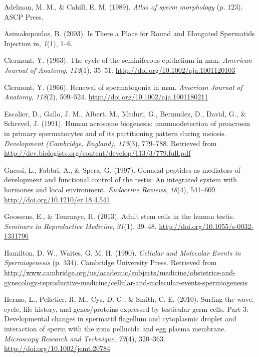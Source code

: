 \documentclass[12pt,twoside]{reedthesis}
\theoremstyle{definition}
\theoremstyle{definition}
\theoremstyle{remark}
\begin{document}
  \noindent
  
  \setlength{\parindent}{-0.20in} \setlength{\leftskip}{0.20in}
  \setlength{\parskip}{8pt}
  
  \hypertarget{refs}{}
  \hypertarget{ref-Adelman1989}{}
  Adelman, M. M., \& Cahill, E. M. (1989). \emph{Atlas of sperm
  morphology} (p. 123). ASCP Press.
  
  \hypertarget{ref-Asimakopoulos2003}{}
  Asimakopoulos, B. (2003). Is There a Place for Round and Elongated
  Spermatids Injection in, \emph{1}(1), 1--6.
  
  \hypertarget{ref-Clermont1963}{}
  Clermont, Y. (1963). The cycle of the seminiferous epithelium in man.
  \emph{American Journal of Anatomy}, \emph{112}(1), 35--51.
  \url{http://doi.org/10.1002/aja.1001120103}
  
  \hypertarget{ref-Clermont1966}{}
  Clermont, Y. (1966). Renewal of spermatogonia in man. \emph{American
  Journal of Anatomy}, \emph{118}(2), 509--524.
  \url{http://doi.org/10.1002/aja.1001180211}
  
  \hypertarget{ref-Escalier1991}{}
  Escalier, D., Gallo, J. M., Albert, M., Meduri, G., Bermudez, D., David,
  G., \& Schrevel, J. (1991). Human acrosome biogenesis: immunodetection
  of proacrosin in primary spermatocytes and of its partitioning pattern
  during meiosis. \emph{Development (Cambridge, England)}, \emph{113}(3),
  779--788. Retrieved from
  \url{http://dev.biologists.org/content/develop/113/3/779.full.pdf}
  
  \hypertarget{ref-Gnessi1997}{}
  Gnessi, L., Fabbri, A., \& Spera, G. (1997). Gonadal peptides as
  mediators of development and functional control of the testis: An
  integrated system with hormones and local environment. \emph{Endocrine
  Reviews}, \emph{18}(4), 541--609.
  \url{http://doi.org/10.1210/er.18.4.541}
  
  \hypertarget{ref-Goossens2013}{}
  Goossens, E., \& Tournaye, H. (2013). Adult stem cells in the human
  testis. \emph{Seminars in Reproductive Medicine}, \emph{31}(1), 39--48.
  \url{http://doi.org/10.1055/s-0032-1331796}
  
  \hypertarget{ref-Hamilton1987}{}
  Hamilton, D. W., Waites, G. M. H. (1990). \emph{Cellular and Molecular
  Events in Spermiogenesis} (p. 334). Cambridge University Press.
  Retrieved from
  \url{http://www.cambridge.org/us/academic/subjects/medicine/obstetrics-and-gynecology-reproductive-medicine/cellular-and-molecular-events-spermiogenesis}
  
  \hypertarget{ref-Hermo2010}{}
  Hermo, L., Pelletier, R. M., Cyr, D. G., \& Smith, C. E. (2010). Surfing
  the wave, cycle, life history, and genes/proteins expressed by
  testicular germ cells. Part 3: Developmental changes in spermatid
  flagellum and cytoplasmic droplet and interaction of sperm with the zona
  pellucida and egg plasma membrane. \emph{Microscopy Research and
  Technique}, \emph{73}(4), 320--363.
  \url{http://doi.org/10.1002/jemt.20784}
  
\end{document}

